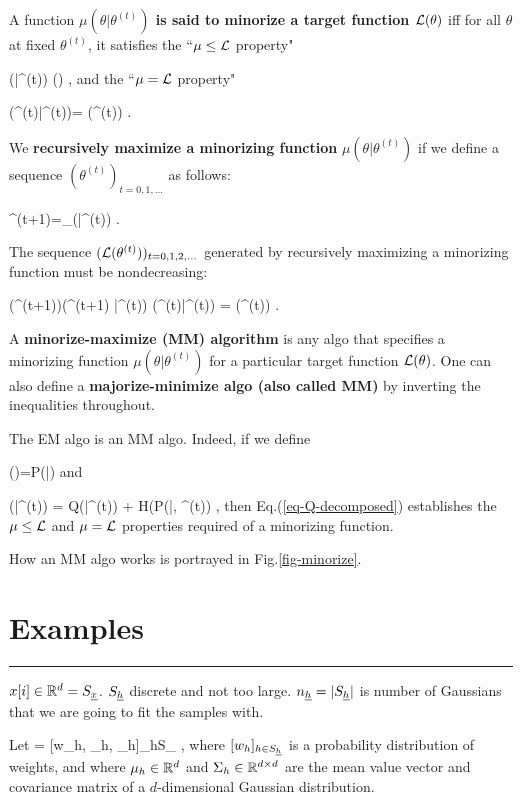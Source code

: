 A function {\bf $\mu(\theta|\theta^{(t)})$ 
is said to minorize 
 a target
 function ${\cal L}(\theta)$}
iff for all $ \theta$ at fixed 
$\theta^{(t)}$,
it satisfies the
``$\mu\leq{\cal L}$ property"


\beq
\mu(\theta|\theta^{(t)})\leq
\call(\theta)
\;,
\eeq
and
the ``$\mu={\cal L}$ property"

\beq
\mu(\theta^{(t)}|\theta^{(t)})=
\call(\theta^{(t)})
\;.
\eeq

We  {\bf recursively maximize a minorizing function} $\mu(\theta|\theta^{(t)})$
if we define a sequence $(\theta^{(t)})_{t=0, 1, \ldots}$
as follows:

\beq
\theta^{(t+1)}=\argmax_\theta \mu(\theta|\theta^{(t)})
\;.
\eeq

The sequence 
$({\cal L}(\theta^{(t)}))_{t=0, 1, 2, \ldots}$
generated by 
recursively maximizing a minorizing function
must be nondecreasing:

\beq
\call(\theta^{(t+1)})\geq \mu(\theta^{(t+1)}
|\theta^{(t)})\geq
 \mu(\theta^{(t)}|\theta^{(t)}) 
= \call(\theta^{(t)})
\;.
\eeq

A {\bf
minorize-maximize (MM) algorithm}
is any algo that
specifies a
minorizing function $\mu(\theta|\theta^{(t)})$
for a particular target
 function ${\cal L}(\theta)$.
One can also define a 
{\bf majorize-minimize algo (also
called  MM)}
by inverting the inequalities throughout.


The EM algo is an MM algo.
Indeed, if we define 

\beq
\call(\theta)=\ln P(\vecx|\theta)
\eeq
and

\beq
\mu(\theta|\theta^{(t)})
=
Q(\theta|\theta^{(t)})
+
H(P(\ul{\vech}|\vecx, \theta^{(t)})
\;,
\eeq
then Eq.(\ref{eq-Q-decomposed})
establishes
the $\mu\leq {\cal L}$
and $\mu={\cal L}$ properties
required of 
a minorizing function.

How an MM algo works 
is portrayed in Fig.\ref{fig-minorize}.


\section*{Examples}

\hrule{}


$x[i]\in { \mathbb{R}}^d=S_{\underline{x}}$. $S_{\underline{h}}$ discrete and
not too large. $n_{\underline{h}}=|S_{\underline{h}}|$ is
number of Gaussians that we are 
going to fit the samples with.

Let
\beq
\theta = [w_h, \mu_h, \Sigma_h]_{h\in S_\rvh}
\;,
\eeq
where
$[w_h]_{h\in S_{\underline{h}}}$ is a probability
distribution of weights, and 
where $\mu_h\in{ \mathbb{R}}^d$
and $\Sigma_h\in{ \mathbb{R}}^{d\times d}$
are the mean value vector 
and covariance matrix of
a $d$-dimensional Gaussian distribution.

